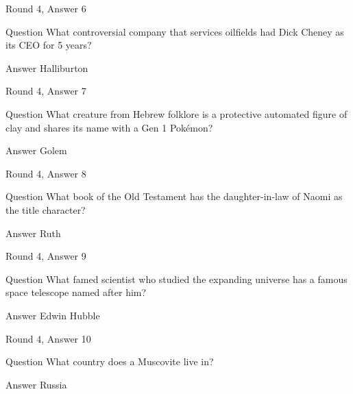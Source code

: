 \documentclass[11pt]{beamer}
\begin{document}
\begin{frame}[t]{Round 4, Answer 6}
\vspace{2em}
\begin{block}{Question}
What controversial company that services oilfields had Dick Cheney as its CEO for 5 years\@?
\end{block}
\pause{}
\begin{block}{Answer}
Halliburton
\end{block}
\end{frame}
    

\begin{frame}[t]{Round 4, Answer 7}
\vspace{2em}
\begin{block}{Question}
What creature from Hebrew folklore is a protective automated figure of clay and shares its name with a Gen 1 Pokémon\@?
\end{block}
\pause{}
\begin{block}{Answer}
Golem
\end{block}
\end{frame}
    

\begin{frame}[t]{Round 4, Answer 8}
\vspace{2em}
\begin{block}{Question}
What book of the Old Testament has the daughter-in-law of Naomi as the title character\@?
\end{block}
\pause{}
\begin{block}{Answer}
Ruth
\end{block}
\end{frame}
    

\begin{frame}[t]{Round 4, Answer 9}
\vspace{2em}
\begin{block}{Question}
What famed scientist who studied the expanding universe has a famous space telescope named after him\@?
\end{block}
\pause{}
\begin{block}{Answer}
Edwin Hubble
\end{block}
\end{frame}
    

\begin{frame}[t]{Round 4, Answer 10}
\vspace{2em}
\begin{block}{Question}
What country does a Muscovite live in\@?
\end{block}
\pause{}
\begin{block}{Answer}
Russia
\end{block}
\end{frame}
    
\end{document}
